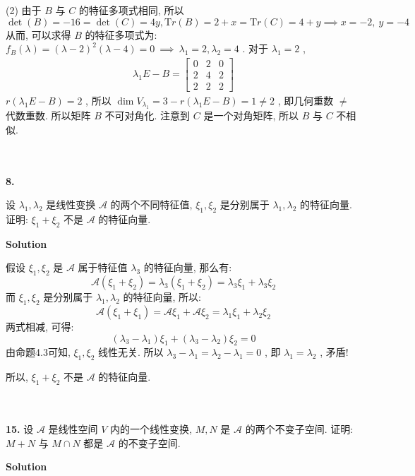 \documentclass[11pt,a4paper,openany,oneside]{book}
\newcommand{\Tr}{\mathrm Tr}
\newcommand\Solution{\noindent\textbf{\textsf{Solution}}\par\medskip}
\begin{document}
(2) 由于 $ B $ 与 $ C $ 的特征多项式相同, 所以
 $$  \det(B)= -16 = \det(C) = 4y, \Tr(B) = 2+x = \Tr(C) = 4+y \implies x = -2,\  y=-4   $$ 
从而, 可以求得 $ B $ 的特征多项式为: $ f_B(\lambda) = (\lambda-2)^2(\lambda-4)=0 \ \implies \ \lambda_1 = 2, \lambda_2 = 4 $ .
对于 $ \lambda_1=2 $ , 
\begin{gather*}
\lambda_1E - B =
\begin{bmatrix}
0  &  2  &  0  \\
2  &  4  &  2  \\
2  &  2  &  2
\end{bmatrix}
\end{gather*}
 $ r(\lambda_1E-B) = 2 $ , 所以 $ \dim V_{\lambda_1} = 3 - r(\lambda_1E-B)=1 \neq 2 $ , 即几何重数 $ \neq $ 代数重数. 所以矩阵 $ B $ 不可对角化. 注意到 $ C $ 是一个对角矩阵, 所以 $ B $ 与 $ C $ 不相似.
\\  \\  \\




\begin{myexample}
	\textbf{8.} 

设 $ \lambda_1, \lambda_2 $ 是线性变换 $ \mathcal{A} $ 的两个不同特征值,  $ \xi_1, \xi_2 $ 是分别属于 $ \lambda_1, \lambda_2 $ 的特征向量. 证明:  $ \xi_1 + \xi_2 $ 不是 $ \mathcal{A} $ 的特征向量. \\

\end{myexample}
\Solution

假设 $ \xi_1, \xi_2 $ 是 $ \mathcal{A} $ 属于特征值 $ \lambda_3 $ 的特征向量, 那么有:
 $$  \mathcal{A}(\xi_1 + \xi_2) = \lambda_3(\xi_1 + \xi_2) = \lambda_3 \xi_1 + \lambda_3 \xi_2  $$ 
而 $ \xi_1, \xi_2 $ 是分别属于 $ \lambda_1, \lambda_2 $ 的特征向量, 所以:
 $$  \mathcal{A}(\xi_1 + \xi_1) = \mathcal{A}\xi_1 + \mathcal{A}\xi_2 = \lambda_1\xi_1 + \lambda_2 \xi_2  $$ 
两式相减, 可得:
 $$  (\lambda_3 - \lambda_1)\xi_1 + (\lambda_3 - \lambda_2)\xi_2 = 0  $$ 
由命题4.3可知,  $ \xi_1, \xi_2 $ 线性无关. 所以 $ \lambda_3 - \lambda_1 = \lambda_2 - \lambda_1 = 0 $ , 即 $ \lambda_1 = \lambda_2 $ , 矛盾!

所以,   $ \xi_1 + \xi_2 $ 不是 $ \mathcal{A} $ 的特征向量.  \\  \\  \\


\begin{myexample}
	\textbf{15.} 设 $ \mathcal{A} $ 是线性空间 $ V $ 内的一个线性变换,  $ M,N $ 是 $ \mathcal{A} $ 的两个不变子空间. 证明: $ M+N $ 与 $ M \cap N $ 都是 $ \mathcal{A} $ 的不变子空间.  
\end{myexample}
\Solution  
\end{document}
